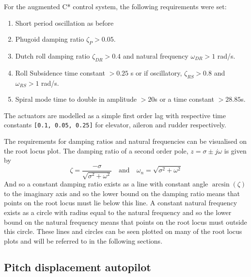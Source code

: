\documentclass{article}
\begin{document}
For the augmented C* control system, the following requirements were set:
\begin{enumerate}
    \renewcommand{\labelenumi}{\roman{enumi})}
    \item Short period oscillation as before
    \item Phugoid damping ratio $\zeta_{P} > 0.05$.
    \item Dutch roll damping ratio $\zeta_{DR} > 0.4$ and natural frequency $\omega_{DR} > 1$ rad/s.
    \item Roll Subsidence time constant $> 0.25$ s or if oscillatory, $\zeta_{RS} > 0.8$ and $\omega_{RS} > 1$ rad/s. \label{req:RS}
    \item Spiral mode time to double in amplitude $>20$s or a time constant $>28.85$s.
\end{enumerate}

The actuators are modelled as a simple first order lag with respective time constants \texttt{[0.1, 0.05, 0.25]} for elevator, aileron and rudder respectively.

The requirements for damping ratios and natural frequencies can be visualised on the root locus plot.
The damping ratio of a second order pole, $z = \sigma \pm j\omega$ is given by
\begin{equation}
    \zeta = \frac{-\sigma}{\sqrt{\sigma^2 + \omega^2}} \quad \text{and} \quad \omega_n = \sqrt{\sigma^2 + \omega^2}
\end{equation}
And so a constant damping ratio exists as a line with constant angle $\arcsin(\zeta)$ to the imaginary axis and so the lower bound on the damping ratio means that points on the root locus must lie below this line.
A constant natural frequency exists as a circle with radius equal to the natural frequency and so the lower bound on the natural frequency means that points on the root locus must outside this circle.
These lines and circles can be seen plotted on many of the root locus plots and will be referred to in the following sections.

\subsection{Pitch displacement autopilot}
\end{document}
